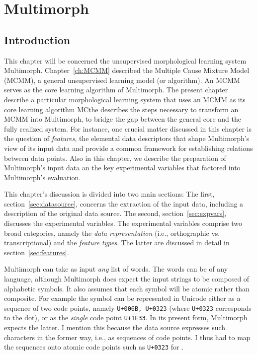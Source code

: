 \chapter{Multimorph}
\label{ch:experi}
\section{Introduction}
This chapter will be concerned the unsupervised morphological learning system Multimorph. Chapter~\ref{ch:MCMM} described the Multiple Cause Mixture Model (MCMM), a general unsupervised learning model (or algorithm). An MCMM serves as the core learning algorithm of Multimorph. The present chapter
 describe a particular morphological learning system that uses an MCMM as its core learning algorithm MCthe 
 describes the steps necessary to transform an MCMM into Multimorph,
to bridge the gap between the general core and the fully realized system. 
For instance, one crucial matter discussed in this chapter is the question of \emph{features}, the elemental data descriptors that shape Multimorph's view of its input data and provide a common framework for establishing relations between data points. %
Also in this chapter, we describe the preparation of Multimorph's input data an the key experimental variables that factored into Multimorph's evaluation.

This chapter's discussion
is divided into two main sections: The first, section~\ref{sec:datasource}, concerns the extraction of the input data, including a description of the original data source. The second, section~\ref{sec:expvars}, discusses the experimental variables. The experimental variables comprise two broad categories, namely the \emph{data representation} (i.e., orthographic vs. transcriptional) and the \emph{feature types}. The latter are discussed in detail in section~\ref{sec:features}. 

Multimorph can take as input \emph{any} list of words. The words can be of any
language, although Multimorph does expect the input strings to be composed
of alphabetic symbols. It also assumes that each symbol will be atomic rather
than composite. 
For example the symbol \textsf{} can be represented in Unicode either 
as a sequence of two code points, namely \texttt{U+006B, U+0323} 
(where \texttt{U+0323}
corresponds to the dot), or as the \emph{single} code point \texttt{U+1E33}. 
In its present form, Multimorph 
expects the latter. I mention this because the data source 
expresses
such characters in the former way, i.e., as sequences of code points. I thus had
to map the sequences onto atomic code points such as \texttt{U+0323} 
for \textsf{}.

